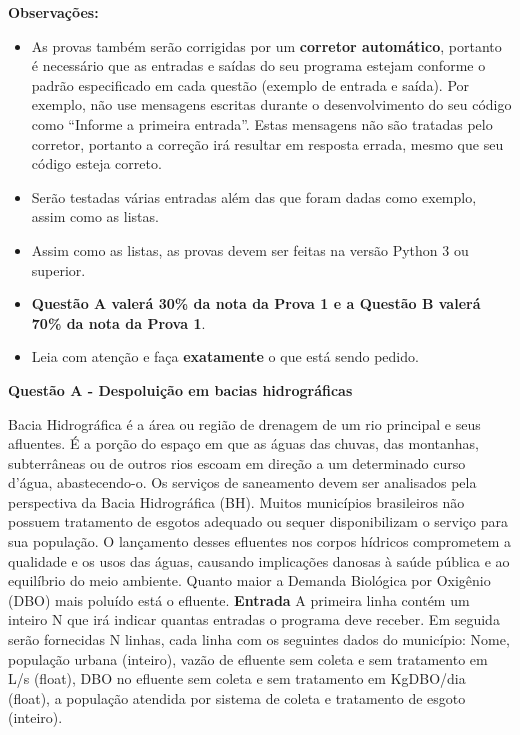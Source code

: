 \documentclass[a4paper, 12pt]{article}
\begin{document}
\textbf{{\large Observações:}}
\begin{itemize}
	\item As provas também serão corrigidas por um \textbf{corretor automático}, portanto é necessário que as entradas e saídas do seu programa estejam conforme o padrão especificado em cada questão (exemplo de entrada e saída). Por exemplo, não use mensagens escritas durante o desenvolvimento do seu código como “Informe a primeira entrada”. Estas mensagens não são tratadas pelo corretor, portanto a correção irá resultar em resposta errada, mesmo que seu código esteja correto.
	\item Serão testadas várias entradas além das que foram dadas como exemplo, assim como as listas.
	\item Assim como as listas, as provas devem ser feitas na versão Python 3 ou superior.
	\item \textbf{Questão A valerá 30\% da nota da Prova 1 e a Questão B valerá 70\% da nota da Prova 1}.
	\item Leia com atenção e faça \textbf{exatamente} o que está sendo pedido.
\end{itemize}
\newpage %
\begin{center}
\textbf{{\Large Questão A - Despoluição em bacias hidrográficas}}
\end{center}
\vspace{5pt}
Bacia Hidrográfica é a área ou região de drenagem de um rio principal e seus afluentes. É a porção do espaço em que as águas das chuvas, das montanhas, subterrâneas ou de outros rios escoam em direção a um determinado curso d’água, abastecendo-o. Os serviços de saneamento devem ser analisados pela perspectiva da Bacia Hidrográfica (BH).  Muitos municípios brasileiros não possuem tratamento de esgotos adequado ou sequer disponibilizam o serviço para sua população. O lançamento desses efluentes nos corpos hídricos comprometem a qualidade e os usos das águas, causando implicações danosas à saúde pública e ao equilíbrio do meio ambiente. Quanto maior a Demanda Biológica por Oxigênio (DBO) mais poluído está o efluente. 
\newline \newline
\textbf{{\large Entrada}} \newline
A primeira linha contém um inteiro N que irá indicar quantas entradas o programa deve receber.
\newline
Em seguida serão fornecidas N linhas, cada linha com os seguintes dados do município: Nome, população urbana (inteiro), vazão de efluente sem coleta e sem tratamento em L/s (float), DBO no efluente sem coleta e sem tratamento em KgDBO/dia (float), a população atendida por sistema de coleta e tratamento de esgoto (inteiro).
\end{document}
